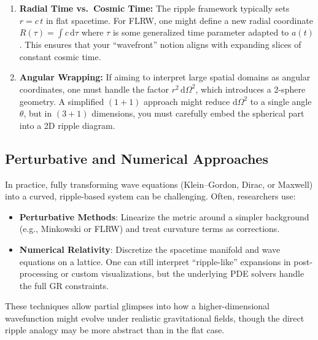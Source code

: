\documentclass[11pt]{article}
\begin{document}
\begin{enumerate}
  \item \textbf{Radial Time vs.\ Cosmic Time:}  
    The ripple framework typically sets $r = c\,t$ in flat spacetime. 
    For FLRW, one might define a new radial coordinate $R(\tau) = \int c\,\mathrm{d}\tau$ 
    where $\tau$ is some generalized time parameter adapted to $a(t)$. 
    This ensures that your ``wavefront'' notion aligns with expanding slices 
    of constant cosmic time.
  \item \textbf{Angular Wrapping:}  
    If aiming to interpret large spatial domains as angular coordinates, 
    one must handle the factor $r^2\,\mathrm{d}\Omega^2$, which introduces 
    a 2-sphere geometry. A simplified $(1+1)$ approach might reduce $\mathrm{d}\Omega^2$ 
    to a single angle $\theta$, but in $(3+1)$ dimensions, you must carefully 
    embed the spherical part into a 2D ripple diagram.
\end{enumerate}

\subsection{Perturbative and Numerical Approaches}
\label{app:subsec:perturb-numerical}
In practice, fully transforming wave equations (Klein--Gordon, Dirac, or Maxwell) 
into a curved, ripple-based system can be challenging. Often, researchers use:

\begin{itemize}
  \item \textbf{Perturbative Methods}: Linearize the metric around a simpler background 
        (e.g., Minkowski or FLRW) and treat curvature terms as corrections.  
  \item \textbf{Numerical Relativity}: Discretize the spacetime manifold and wave equations 
        on a lattice. One can still interpret “ripple-like” expansions in post-processing 
        or custom visualizations, but the underlying PDE solvers handle the full GR constraints.
\end{itemize}

\noindent
These techniques allow partial glimpses into how a higher-dimensional wavefunction 
might evolve under realistic gravitational fields, though the direct ripple analogy 
may be more abstract than in the flat case.
\end{document}
